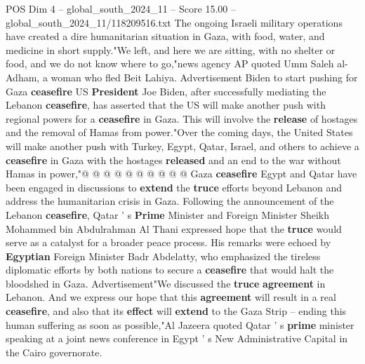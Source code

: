 \begin{textsample}{POS Dim 4 – global\_south\_2024\_11 – Score 15.00 – global\_south\_2024\_11/118209516.txt}
The ongoing Israeli military operations have created a dire humanitarian situation in Gaza, with food, water, and medicine in short supply."We left, and here we are sitting, with no shelter or food, and we do not know where to go,"news agency AP quoted Umm Saleh al-Adham, a woman who fled Beit Lahiya.
Advertisement Biden to start pushing for Gaza \textbf{ceasefire} US \textbf{President} Joe Biden, after successfully mediating the Lebanon \textbf{ceasefire}, has asserted that the US will make another push with regional powers for a \textbf{ceasefire} in Gaza.
This will involve the \textbf{release} of hostages and the removal of Hamas from power."Over the coming days, the United States will make another push with Turkey, Egypt, Qatar, Israel, and others to achieve a \textbf{ceasefire} in Gaza with the hostages \textbf{released} and an end to the war without Hamas in power,"@ @ @ @ @ @ @ @ @ @ Gaza \textbf{ceasefire} Egypt and Qatar have been engaged in discussions to \textbf{extend} the \textbf{truce} efforts beyond Lebanon and address the humanitarian crisis in Gaza.
Following the announcement of the Lebanon \textbf{ceasefire}, Qatar ' s \textbf{Prime} Minister and Foreign Minister Sheikh Mohammed bin Abdulrahman Al Thani expressed hope that the \textbf{truce} would serve as a catalyst for a broader peace process.
His remarks were echoed by \textbf{Egyptian} Foreign Minister Badr Abdelatty, who emphasized the tireless diplomatic efforts by both nations to secure a \textbf{ceasefire} that would halt the bloodshed in Gaza.
Advertisement"We discussed the \textbf{truce} \textbf{agreement} in Lebanon.
And we express our hope that this \textbf{agreement} will result in a real \textbf{ceasefire}, and also that its \textbf{effect} will \textbf{extend} to the Gaza Strip -- ending this human suffering as soon as possible,"Al Jazeera quoted Qatar ' s \textbf{prime} minister speaking at a joint news conference in Egypt ' s New Administrative Capital in the Cairo governorate.

\end{textsample}
